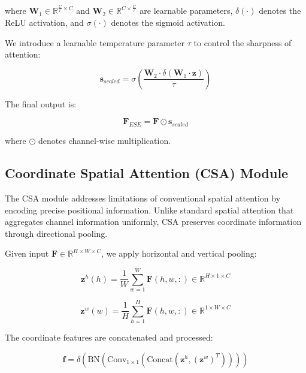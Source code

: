 \documentclass[default, iicol]{sn-jnl}
\theoremstyle{thmstyleone}%
\theoremstyle{thmstyletwo}%
\theoremstyle{thmstylethree}%
\begin{document}
where $\mathbf{W}_1 \in \mathbb{R}^{\frac{C}{r} \times C}$ and $\mathbf{W}_2 \in \mathbb{R}^{C \times \frac{C}{r}}$ are learnable parameters, $\delta(\cdot)$ denotes the ReLU activation, and $\sigma(\cdot)$ denotes the sigmoid activation.

We introduce a learnable temperature parameter $\tau$ to control the sharpness of attention:

\begin{equation}
\mathbf{s}_{scaled} = \sigma\left(\frac{\mathbf{W}_2 \cdot \delta\left(\mathbf{W}_1 \cdot \mathbf{z}\right)}{\tau}\right)
\label{eq:temp_scaling}
\end{equation}

The final output is:

\begin{equation}
\mathbf{F}_{ESE} = \mathbf{F} \odot \mathbf{s}_{scaled}
\label{eq:ese_output}
\end{equation}

where $\odot$ denotes channel-wise multiplication.

\subsection{Coordinate Spatial Attention (CSA) Module}

The CSA module addresses limitations of conventional spatial attention by encoding precise positional information. Unlike standard spatial attention that aggregates channel information uniformly, CSA preserves coordinate information through directional pooling.

Given input $\mathbf{F} \in \mathbb{R}^{H \times W \times C}$, we apply horizontal and vertical pooling:

\begin{equation}
\mathbf{z}^h(h) = \frac{1}{W} \sum_{w=1}^{W} \mathbf{F}(h,w,:) \in \mathbb{R}^{H \times 1 \times C}
\label{eq:h_pool}
\end{equation}

\begin{equation}
\mathbf{z}^w(w) = \frac{1}{H} \sum_{h=1}^{H} \mathbf{F}(h,w,:) \in \mathbb{R}^{1 \times W \times C}
\label{eq:w_pool}
\end{equation}

The coordinate features are concatenated and processed:

\begin{equation}
\mathbf{f} = \delta\left(\text{BN}\left(\text{Conv}_{1\times1}\left(\text{Concat}(\mathbf{z}^h, (\mathbf{z}^w)^T)\right)\right)\right)
\label{eq:coord_concat}
\end{equation}
\end{document}
